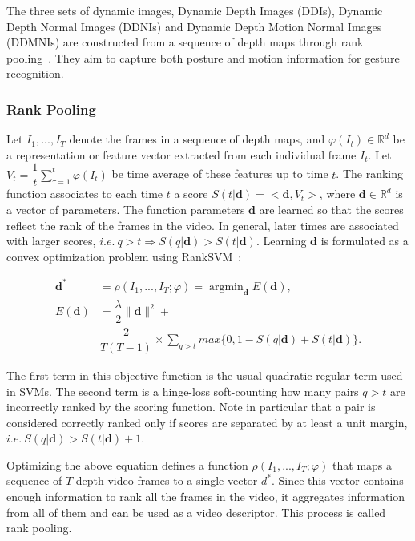 \documentclass[10pt, a4paper, conference]{IEEEtran}
\begin{document}
The three sets of dynamic images, Dynamic Depth Images (DDIs), Dynamic Depth Normal Images (DDNIs) and Dynamic Depth Motion Normal Images (DDMNIs) are constructed from a sequence of depth maps through rank pooling~\cite{bilen2016dynamic}. They aim to capture both posture and motion information for gesture recognition.

\subsubsection{Rank Pooling}

Let $I_{1},...,I_{T}$ denote the frames in a sequence of depth maps, and $\varphi(I_{t}) \in \mathbb{R}^{d}$ be a representation or feature vector extracted from each individual frame $I_{t}$. Let $V_{t} = \dfrac{1}{t}\sum_{\tau=1}^{t}\varphi(I_{t})$ be time average of these features up to time $t$. The ranking function associates to each time $t$ a score $S(t|\textbf{d}) = <\textbf{d}, V_{t}>$, where $\textbf{d} \in \mathbb{R}^{d}$ is a vector of parameters. The function parameters $\textbf{d}$ are learned so that the scores reflect the rank of the frames in the video. In general, later times are associated with larger scores, $ i.e. ~q > t \Rightarrow S(q|\textbf{d}) > S(t|\textbf{d})$. Learning $\textbf{d}$ is formulated as a convex optimization problem using RankSVM~\cite{smola2004tutorial}:

\begin{equation}
\begin{aligned}
\textbf{d}^{*} &=\rho(I_{1},...,I_{T};\varphi) = \mathop{\arg\min}_{\textbf{d}} E(\textbf{d}),\\
  E(\textbf{d}) &= \dfrac{\lambda}{2}\parallel \textbf{d} \parallel^{2} +\\
  & \dfrac{2}{T(T-1)}\times\sum\limits_{q>t}max\{{0,1-S(q|\textbf{d}) + S(t|\textbf{d})}\}.
\end{aligned}
\end{equation}

The first term in this objective function is the usual quadratic regular term used in SVMs. The second term is a hinge-loss soft-counting how many pairs $q > t$ are incorrectly ranked by the scoring function. Note in particular that a pair is considered correctly ranked only if scores are separated by at least a unit margin, $i.e.~ S(q|\textbf{d}) > S(t|\textbf{d}) + 1$.

Optimizing the above equation defines a function $\rho(I_{1},...,I_{T};\varphi)$ that maps a sequence of $T$ depth video frames to a single vector $d^{*}$. Since this vector contains enough information to rank all the frames in the video, it aggregates information from all of them and can be used as a video descriptor. This process is called rank pooling.
\end{document}
